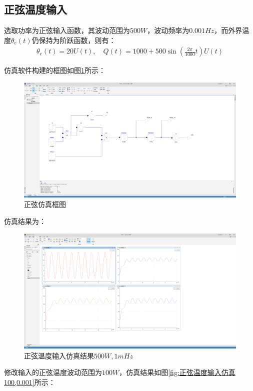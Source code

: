 \documentclass[11pt]{article}
\begin{document}
\subsection{正弦温度输入}
选取功率为正弦输入函数，其波动范围为$500\unit{W}$，波动频率为$0.001\unit{Hz}$，而外界温度$\theta_e(t)$仍保持为阶跃函数，则有：
\begin{align*}
  \theta_e(t)=20U(t),\quad Q(t)=1000+500\sin\left(\frac{2\pi}{1000}t\right)U(t)
\end{align*}\par
仿真软件构建的框图如图\ref{fig:正弦仿真框图}所示：
\begin{figure}[H]
  \centering
  \includegraphics[width=1.0\textwidth]{正弦仿真框图.png}
  \caption{正弦仿真框图}
  \label{fig:正弦仿真框图}
\end{figure}
仿真结果为：
\begin{figure}[H]
  \centering
  \includegraphics[width=1.0\textwidth]{正弦温度输入仿真50,0.001.png}
  \caption{正弦温度输入仿真结果$500\unit{W},1\unit{mHz}$}
  \label{fig:正弦温度输入仿真50,0.001}
\end{figure}
修改输入的正弦温度波动范围为$100\unit{W}$，仿真结果如图\ref{fig:正弦温度输入仿真100,0.001}所示：
\end{document}
